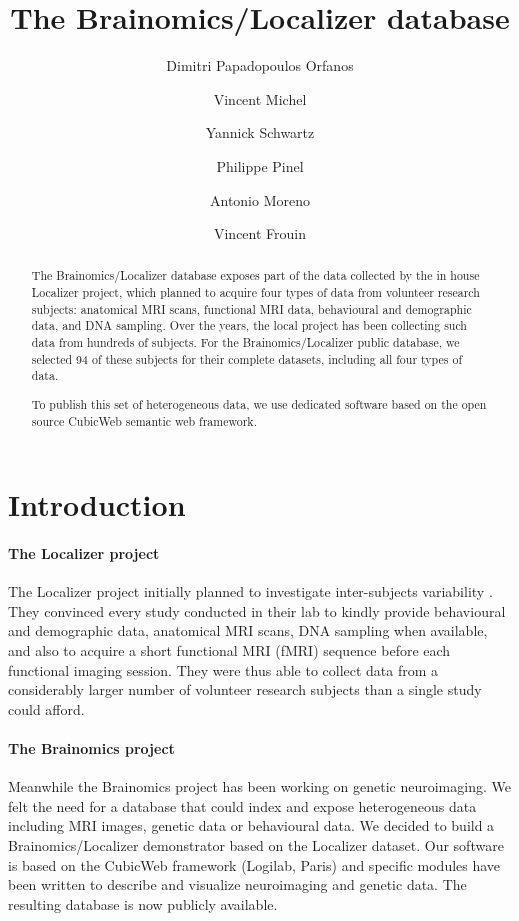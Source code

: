 \documentclass[review]{elsarticle}
\begin{document}
\begin{frontmatter}

\title{The Brainomics/Localizer database}

\author[neurospin]{Dimitri Papadopoulos Orfanos}
\author[logilab]{Vincent Michel}
\author[neurospin]{Yannick Schwartz}
\author[neurospin]{Philippe Pinel}
\author[neurospin]{Antonio Moreno}
\author[neurospin]{Vincent Frouin}

\address[neurospin]{I2BM, Neurospin, CEA/Saclay}
\address[logilab]{Logilab}

\begin{abstract}
The Brainomics/Localizer database exposes part of the data collected by
the in house Localizer project, which planned to acquire four types of
data from volunteer research subjects: anatomical MRI scans, functional MRI
data, behavioural and demographic data, and DNA sampling. Over the years, the
local project has been collecting such data from hundreds of subjects. For the
Brainomics/Localizer public database, we selected 94 of these subjects for their
complete datasets, including all four types of data.

To publish this set of heterogeneous data, we use dedicated software based on
the open source CubicWeb semantic web framework.
\end{abstract}

\end{frontmatter}


\section{Introduction}

\paragraph{The Localizer project} The Localizer project initially planned
to investigate inter-subjects variability \cite{Pinel2007}. They convinced every
study conducted in their lab to kindly provide behavioural and demographic data,
anatomical MRI scans, DNA sampling when available, and also to acquire a short
functional MRI (fMRI) sequence before each functional imaging session. They were
thus able to collect data from a considerably larger number of volunteer research
subjects than a single study could afford. 

\paragraph{The Brainomics project} Meanwhile the Brainomics project has been
working on genetic neuroimaging. We felt the need for a database that could index
and expose heterogeneous data including MRI images, genetic data or behavioural
data. We decided to build a Brainomics/Localizer demonstrator based on the Localizer
dataset. Our software is based on the CubicWeb framework (Logilab, Paris)
and specific modules have been written to describe and visualize neuroimaging
and genetic data. The resulting database is now publicly available.
\end{document}
